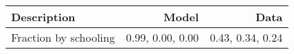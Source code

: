 \begin{tabular}{lrr}
\hline
Description & Model  & Data  \\ 
\hline
Fraction by schooling & 0.99, 0.00, 0.00  & 0.43, 0.34, 0.24  \\ 
\hline
\end{tabular}%
